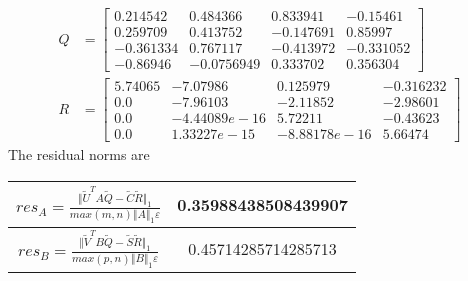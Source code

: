 \begin{example}
{\begin{enumerate}[(1).]
\begin{align*}
                Q &= \begin{bmatrix}
                  0.214542 &   0.484366  &  0.833941 &  -0.15461 \\
                  0.259709 &   0.413752  & -0.147691 &   0.85997 \\ 
                 -0.361334 &   0.767117  & -0.413972 & -0.331052 \\
                 -0.86946  & -0.0756949  &  0.333702 &  0.356304
                \end{bmatrix} \\
                R &= \begin{bmatrix}
                 5.74065 & -7.07986      & 0.125979 &    -0.316232 \\
                 0.0     & -7.96103      & -2.11852 &     -2.98601 \\
                 0.0     & -4.44089e-16  & 5.72211  &     -0.43623 \\
                 0.0     &  1.33227e-15  & -8.88178e-16 &  5.66474     
                \end{bmatrix} 
            \end{align*}
The residual norms are
\begin{center}
\begin{tabular}{c||c} \hline
$res_{A} = \frac{\Vert \tilde{U}^TA\tilde{Q} - \tilde{C}\tilde{R}\Vert_1}{max(m,n)\Vert A \Vert_1 \varepsilon}$ & 0.35988438508439907 \\ \hline
$res_{B} = \frac{\Vert \tilde{V}^TB\tilde{Q} - \tilde{S}\tilde{R}\Vert_1}{max(p,n)\Vert B \Vert_1 \varepsilon}$ & 0.45714285714285713 \\ 
\hline
\end{tabular}
\end{center}


\end{enumerate}}
\end{example}
